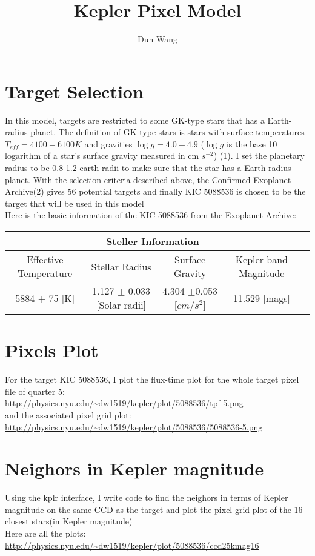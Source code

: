 \documentclass[]{article}
\begin{document}
\title{Kepler Pixel Model}
\author{Dun Wang}
\maketitle

\section{Target Selection}

In this model, targets are restricted to some GK-type stars that has a Earth-radius planet. The definition of GK-type stars is stars with surface temperatures $T_{eff}=4100-6100K$ and gravities $\log g= 4.0-4.9$ ($\log g$ is the base 10 logarithm of a star’s surface gravity measured in cm $s^{-2}$) (1). I set the planetary radius to be 0.8-1.2 earth radii to make sure that the star has a Earth-radius planet. With the selection criteria described above, the Confirmed Exoplanet Archive(2) gives 56 potential targets and finally KIC 5088536 is chosen to be the target that will be used in this model\\
Here is the basic information of the KIC 5088536 from the Exoplanet Archive:
\begin{center}
    \begin{tabular}{ |c| c | c | c |  p{5cm} |}
    \hline
    \multicolumn{4}{|c|}{Steller Information}\\
    \hline
    Effective Temperature & Stellar Radius & Surface Gravity & Kepler-band  Magnitude \\ \hline
    5884 $\pm$ 75 [K] & 1.127 $\pm$ 0.033 [Solar radii] & 4.304 $\pm$0.053 [$cm/s^{2}$] & 11.529 [mags]\\ \hline
    \end{tabular}
\end{center}

\section{Pixels Plot}
For the target KIC 5088536, I plot the flux-time plot for the whole target pixel file of  quarter 5:\\
\url{http://physics.nyu.edu/~dw1519/kepler/plot/5088536/tpf-5.png}\\
and the associated pixel grid plot:\\
\url{http://physics.nyu.edu/~dw1519/kepler/plot/5088536/5088536-5.png}

\section{Neighors in Kepler magnitude}
Using the kplr interface, I write code to find the neighors in terms of Kepler magnitude on the same CCD as the target and plot the pixel grid plot of the 16 closest stars(in Kepler magnitude)\\
Here are all the plots:\\
\url{http://physics.nyu.edu/~dw1519/kepler/plot/5088536/ccd25kmag16}
\end{document}
